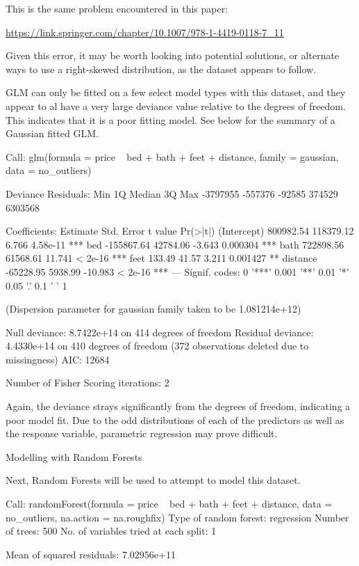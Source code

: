 \documentclass[11pt, a4paper]{article}
\begin{document}
This is the same problem encountered in this paper:
\par
\url{https://link.springer.com/chapter/10.1007/978-1-4419-0118-7\_11}
\par
Given this error, it may be worth looking into potential solutions, or alternate ways to use a right-skewed distribution, as the dataset appears to follow.
\par
GLM can only be fitted on a few select model types with this dataset, and they appear to al have a very large deviance value relative to the degrees of freedom. This indicates that it is a poor fitting model. See below for the summary of a Gaussian fitted GLM.

\begin{Schunk}
\begin{Soutput}
Call:
glm(formula = price ~ bed + bath + feet + distance, family = gaussian, 
    data = no_outliers)

Deviance Residuals: 
     Min        1Q    Median        3Q       Max  
-3797955   -557376    -92585    374529   6303568  

Coefficients:
              Estimate Std. Error t value Pr(>|t|)    
(Intercept)  800982.54  118379.12   6.766 4.58e-11 ***
bed         -155867.64   42784.06  -3.643 0.000304 ***
bath         722898.56   61568.61  11.741  < 2e-16 ***
feet            133.49      41.57   3.211 0.001427 ** 
distance     -65228.95    5938.99 -10.983  < 2e-16 ***
---
Signif. codes:  0 '***' 0.001 '**' 0.01 '*' 0.05 '.' 0.1 ' ' 1

(Dispersion parameter for gaussian family taken to be 1.081214e+12)

    Null deviance: 8.7422e+14  on 414  degrees of freedom
Residual deviance: 4.4330e+14  on 410  degrees of freedom
  (372 observations deleted due to missingness)
AIC: 12684

Number of Fisher Scoring iterations: 2
\end{Soutput}
\end{Schunk}

Again, the deviance strays significantly from the degrees of freedom, indicating a poor model fit. Due to the odd distributions of each of the predictors as well as the response variable, parametric regression may prove difficult. 


\pagebreak
Modelling with Random Forests
\par
Next, Random Forests will be used to attempt to model this dataset.

\begin{Schunk}
\begin{Soutput}
Call:
 randomForest(formula = price ~ bed + bath + feet + distance,      data = no_outliers, na.action = na.roughfix) 
               Type of random forest: regression
                     Number of trees: 500
No. of variables tried at each split: 1

          Mean of squared residuals: 7.02956e+11
\end{Soutput}
\end{Schunk}
\end{document}
